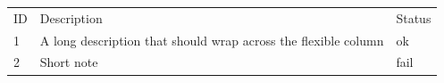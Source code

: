 \begin{tabularx}{\linewidth}{lXl}
ID & Description & Status \\
1 & A long description that should wrap across the flexible column & ok \\
2 & Short note & fail \\
\end{tabularx}
